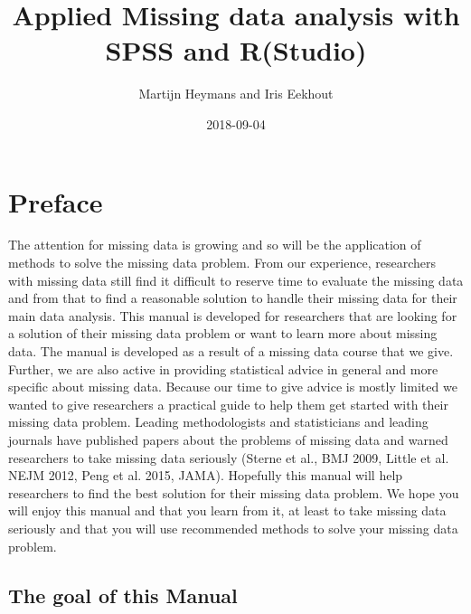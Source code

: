 \documentclass[]{book}
\title{Applied Missing data analysis with SPSS and R(Studio)}
\author{Martijn Heymans and Iris Eekhout}
\date{2018-09-04}
\theoremstyle{definition}
\theoremstyle{definition}
\theoremstyle{definition}
\theoremstyle{remark}
\begin{document}
\maketitle

{
\setcounter{tocdepth}{1}
\tableofcontents
}
\chapter*{Preface}\label{preface}

The attention for missing data is growing and so will be the application
of methods to solve the missing data problem. From our experience,
researchers with missing data still find it difficult to reserve time to
evaluate the missing data and from that to find a reasonable solution to
handle their missing data for their main data analysis. This manual is
developed for researchers that are looking for a solution of their
missing data problem or want to learn more about missing data. The
manual is developed as a result of a missing data course that we give.
Further, we are also active in providing statistical advice in general
and more specific about missing data. Because our time to give advice is
mostly limited we wanted to give researchers a practical guide to help
them get started with their missing data problem. Leading methodologists
and statisticians and leading journals have published papers about the
problems of missing data and warned researchers to take missing data
seriously (Sterne et al., BMJ 2009, Little et al. NEJM 2012, Peng et al.
2015, JAMA). Hopefully this manual will help researchers to find the
best solution for their missing data problem. We hope you will enjoy
this manual and that you learn from it, at least to take missing data
seriously and that you will use recommended methods to solve your
missing data problem.

\section{The goal of this Manual}\label{the-goal-of-this-manual}
\end{document}

